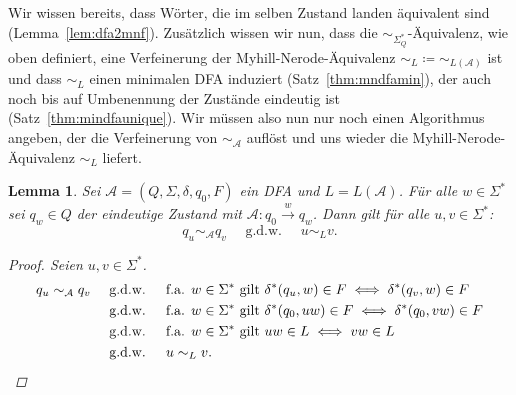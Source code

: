 \documentclass[11pt, a4paper]{article}
\theoremstyle{definition}
\theoremstyle{plain}
\newtheorem{lemma}[definition]{Lemma}
\numberwithin{equation}{section}
\newcommand{\reaches}{\xrightarrow}
\begin{document}
Wir wissen bereits, dass Wörter, die im selben Zustand landen äquivalent sind (Lemma~\ref{lem:dfa2mnf}). Zusätzlich wissen wir nun, dass die $\sim_{\Sigma^\ast_Q}$-Äquivalenz, wie oben definiert, eine Verfeinerung der Myhill-Nerode-Äquivalenz $\sim_L \coloneqq \sim_{L(\mathcal{A})}$ ist und dass $\sim_L$ einen minimalen DFA induziert (Satz~\ref{thm:mndfamin}), der auch noch bis auf Umbenennung der Zustände eindeutig ist (Satz~\ref{thm:mindfaunique}). Wir müssen also nun nur noch einen Algorithmus angeben, der die Verfeinerung von $\sim_\mathcal{A}$ auflöst und uns wieder die Myhill-Nerode-Äquivalenz $\sim_L$ liefert.
\begin{lemma}\label{lem:mn_se}
	Sei $\mathcal{A} = (Q, \Sigma, \delta, q_0, F)$ ein DFA und $L = L(\mathcal{A})$. Für alle $w \in \Sigma^\ast$ sei $q_w \in Q$ der eindeutige Zustand mit $\mathcal{A}: q_0 \reaches{w} q_w$. Dann gilt für alle $u, v \in \Sigma^\ast$:
	$$
		q_u \sim_\mathcal{A} q_v \quad\text{ g.d.w. }\quad u \sim_L v.
	$$
	\begin{proof}
		Seien $u, v \in \Sigma^\ast$.
		\begin{align*}
			q_u \sim_\mathcal{A} q_v &\quad\text{ g.d.w. }\quad \text{f.a. } w \in \Sigma^\ast \text{ gilt } \delta^\ast(q_u, w) \in F \iff \delta^\ast(q_v, w) \in F\\
			&\quad\text{ g.d.w. }\quad \text{f.a. } w \in \Sigma^\ast \text{ gilt } \delta^\ast(q_0, uw) \in F \iff \delta^\ast(q_0, vw) \in F\\
			&\quad\text{ g.d.w. }\quad \text{f.a. } w \in \Sigma^\ast \text{ gilt } uw \in L \iff vw \in L\\
			&\quad\text{ g.d.w. }\quad u \sim_L v.\qedhere
		\end{align*}
	\end{proof}
\end{lemma}
\end{document}
